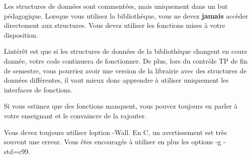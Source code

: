 Les structures de données sont commentées, mais uniquement dans un but pédagogique. Lorsque vous utilisez la bibliothèque, vous ne devez {\bfseries jamais} accèder directement aux structures. Vous devez utiliser les fonctions mises à votre disposition.

L\textquotesingle{}intérêt est que si les structures de données de la bibliothèque changent en cours d\textquotesingle{}année, votre code continuera de fonctionner. De plus, lors du contrôle T\+P de fin de semestre, vous pourriez avoir une version de la librairie avec des structures de données différentes, il vaut mieux donc apprendre à utiliser uniquement les interfaces de fonctions.

Si vous estimez que des fonctions manquent, vous pouvez toujours en parler à votre enseignant et le convaincre de la rajouter.

Vous devez toujours utiliser l\textquotesingle{}option {\ttfamily -\/\+Wall}. En C, un avertissement est très souvent une erreur. Vous êtes encouragés à utiliser en plus les options {\ttfamily -\/g -\/std=c99}. 